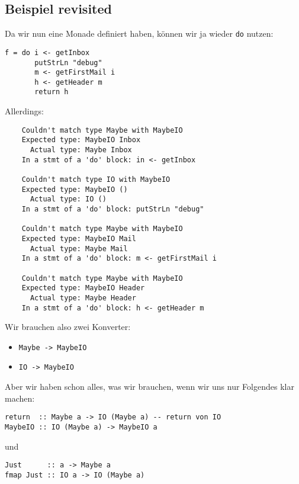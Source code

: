 \documentclass{beamer}
\begin{document}
\subsection{Beispiel revisited}
\begin{frame}[fragile]
Da wir nun eine Monade definiert haben, können wir ja wieder \texttt{do} nutzen:
\begin{verbatim}
f = do i <- getInbox
       putStrLn "debug"
       m <- getFirstMail i
       h <- getHeader m
       return h
\end{verbatim}
\end{frame}
\begin{frame}[fragile]
Allerdings:
\begin{verbatim}
    Couldn't match type Maybe with MaybeIO
    Expected type: MaybeIO Inbox
      Actual type: Maybe Inbox
    In a stmt of a 'do' block: in <- getInbox

    Couldn't match type IO with MaybeIO
    Expected type: MaybeIO ()
      Actual type: IO ()
    In a stmt of a 'do' block: putStrLn "debug"

    Couldn't match type Maybe with MaybeIO
    Expected type: MaybeIO Mail
      Actual type: Maybe Mail
    In a stmt of a 'do' block: m <- getFirstMail i
    
    Couldn't match type Maybe with MaybeIO
    Expected type: MaybeIO Header
      Actual type: Maybe Header
    In a stmt of a 'do' block: h <- getHeader m
\end{verbatim}
\end{frame}

\begin{frame}[fragile]
Wir brauchen also zwei Konverter:\smallskip

\begin{itemize}
 \item \texttt{Maybe -> MaybeIO}
 \item \texttt{IO -> MaybeIO}
\end{itemize}
\smallskip

\pause
Aber wir haben schon alles, was wir brauchen, wenn wir uns nur Folgendes klar machen:\smallskip

\begin{verbatim}
return  :: Maybe a -> IO (Maybe a) -- return von IO
MaybeIO :: IO (Maybe a) -> MaybeIO a
\end{verbatim}
\smallskip

\pause
und
\begin{verbatim}
Just      :: a -> Maybe a
fmap Just :: IO a -> IO (Maybe a)
\end{verbatim}
\end{frame}
\end{document}
